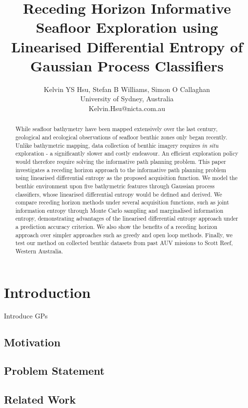 \documentclass{article}
\title{Receding Horizon Informative Seafloor Exploration using Linearised Differential Entropy of Gaussian Process Classifiers}
\author{Kelvin YS Hsu, Stefan B Williams, Simon O Callaghan \\ University of Sydney, Australia \\ 
Kelvin.Hsu@nicta.com.au}
\begin{document}
\maketitle

\begin{abstract}
	While seafloor bathymetry have been mapped extensively over the last century, geological and ecological observations of seafloor benthic zones only began recently. Unlike bathymetric mapping, data collection of benthic imagery requires \textit{in situ} exploration - a significantly slower and costly endeavour. An efficient exploration policy would therefore require solving the informative path planning problem. This paper investigates a receding horizon approach to the informative path planning problem using linearised differential entropy as the proposed acquisition function. We model the benthic environment upon five bathymetric features through Gaussian process classifiers, whose linearised differential entropy would be defined and derived. We compare receding horizon methods under several acquisition functions, such as joint information entropy through Monte Carlo sampling and marginalised information entropy, demonstrating advantages of the linearised differential entropy approach under a prediction accuracy criterion. We also show the benefits of a receding horizon approach over simpler approaches such as greedy and open loop methods. Finally, we test our method on collected benthic datasets from past AUV missions to Scott Reef, Western Australia.
	
\end{abstract}

\section{Introduction}
\label{Section:Introduction}
	
	Introduce GPs \cite{GaussianProcessForMachineLearning}
	
	\subsection{Motivation}
		

		
	\subsection{Problem Statement}


		
	\subsection{Related Work}
	
\end{document}
